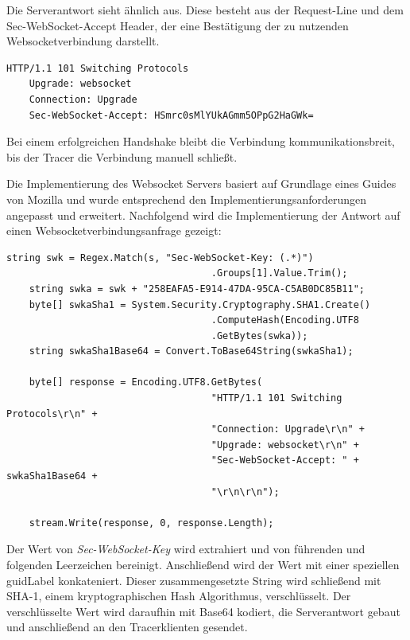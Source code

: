 Die Serverantwort sieht ähnlich aus. Diese besteht aus der Request-Line und dem Sec-WebSocket-Accept Header, der eine Bestätigung der zu nutzenden Websocketverbindung darstellt.

\begin{minipage}[]{\textwidth}
	\begin{lstlisting}[frame=trBL]
	HTTP/1.1 101 Switching Protocols
	Upgrade: websocket
	Connection: Upgrade
	Sec-WebSocket-Accept: HSmrc0sMlYUkAGmm5OPpG2HaGWk=
	\end{lstlisting}
	\label{listing:Serverantwort eines Websocket Handshake}
\end{minipage} 

Bei einem erfolgreichen Handshake bleibt die Verbindung kommunikationsbreit, bis der Tracer die Verbindung manuell schließt.

Die Implementierung des Websocket Servers basiert auf Grundlage eines Guides von Mozilla und wurde entsprechend den Implementierungsanforderungen angepasst und erweitert. Nachfolgend wird die Implementierung der Antwort auf einen Websocketverbindungsanfrage gezeigt:

\begin{minipage}[]{\textwidth}
	\begin{lstlisting}[frame=trBL]
	string swk = Regex.Match(s, "Sec-WebSocket-Key: (.*)")
									.Groups[1].Value.Trim();
	string swka = swk + "258EAFA5-E914-47DA-95CA-C5AB0DC85B11";
	byte[] swkaSha1 = System.Security.Cryptography.SHA1.Create()
									.ComputeHash(Encoding.UTF8
									.GetBytes(swka));
	string swkaSha1Base64 = Convert.ToBase64String(swkaSha1);
	
	byte[] response = Encoding.UTF8.GetBytes(
									"HTTP/1.1 101 Switching Protocols\r\n" +
									"Connection: Upgrade\r\n" +
									"Upgrade: websocket\r\n" +
									"Sec-WebSocket-Accept: " + swkaSha1Base64 +
									"\r\n\r\n");
	
	stream.Write(response, 0, response.Length);
	\end{lstlisting}
	\label{listing:Implementierung der Serverantwort eines Websocket Handshake}
\end{minipage}

Der Wert von \emph{Sec-WebSocket-Key} wird extrahiert und von führenden und folgenden Leerzeichen bereinigt. Anschließend wird der Wert mit einer speziellen \gls{guidLabel} konkateniert. Dieser zusammengesetzte String wird schließend mit SHA-1, einem kryptographischen Hash Algorithmus, verschlüsselt. Der verschlüsselte Wert wird daraufhin mit Base64 kodiert, die Serverantwort gebaut und anschließend an den Tracerklienten gesendet.

